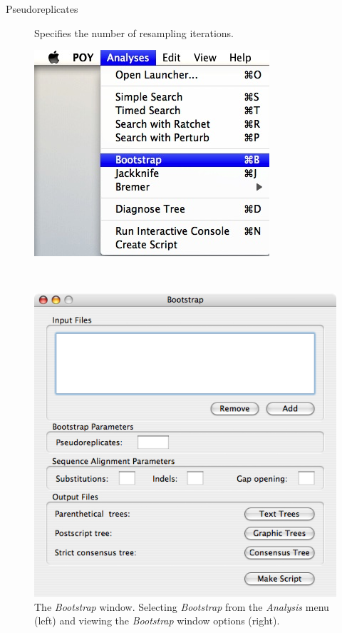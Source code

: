 {\begin{description}
\item[Pseudoreplicates] Specifies the number of resampling iterations.
\end{description}

\begin{figure}
\centering
\begin{minipage}[c]{0.45\textwidth}
\includegraphics[width=\textwidth]{doc/figures/bootstrap_menu.jpg}
\end{minipage}
\,
\begin{minipage}[c]{0.52\textwidth}
\includegraphics[width=\textwidth]{doc/figures/bootstrap_window.jpg}
\end{minipage}
\caption{The \emph{Bootstrap} window. Selecting \emph{Bootstrap} from the \emph{Analysis} menu (left) and 
viewing the \emph{Bootstrap} window options (right).}
\label{fig:bootstrap}
\end{figure}

}

